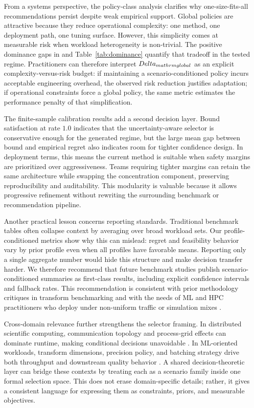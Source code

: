 \documentclass{article} %
\begin{document}
From a systems perspective, the policy-class analysis clarifies why one-size-fits-all recommendations persist despite weak empirical support. Global policies are attractive because they reduce operational complexity: one method, one deployment path, one tuning surface. However, this simplicity comes at measurable risk when workload heterogeneity is non-trivial. The positive dominance gaps in  and Table~\ref{tab:dominance} quantify that tradeoff in the tested regime. Practitioners can therefore interpret $\\Delta_{\\mathrm{global}}$ as an explicit complexity-versus-risk budget: if maintaining a scenario-conditioned policy incurs acceptable engineering overhead, the observed risk reduction justifies adaptation; if operational constraints force a global policy, the same metric estimates the performance penalty of that simplification.

The finite-sample calibration results add a second decision layer. Bound satisfaction at rate $1.0$ indicates that the uncertainty-aware selector is conservative enough for the generated regime, but the large mean gap between bound and empirical regret also indicates room for tighter confidence design. In deployment terms, this means the current method is suitable when safety margins are prioritized over aggressiveness. Teams requiring tighter margins can retain the same architecture while swapping the concentration component, preserving reproducibility and auditability. This modularity is valuable because it allows progressive refinement without rewriting the surrounding benchmark or recommendation pipeline.

Another practical lesson concerns reporting standards. Traditional benchmark tables often collapse context by averaging over broad workload sets. Our profile-conditioned metrics show why this can mislead: regret and feasibility behavior vary by prior profile even when all profiles have favorable means. Reporting only a single aggregate number would hide this structure and make decision transfer harder. We therefore recommend that future benchmark studies publish scenario-conditioned summaries as first-class results, including explicit confidence intervals and fallback rates. This recommendation is consistent with prior methodology critiques in transform benchmarking and with the needs of ML and HPC practitioners who deploy under non-uniform traffic or simulation mixes \citep{S03,S21,S42}.

Cross-domain relevance further strengthens the selector framing. In distributed scientific computing, communication topology and process-grid effects can dominate runtime, making conditional decisions unavoidable \citep{S06,S07,S09,S36,S42}. In ML-oriented workloads, transform dimensions, precision policy, and batching strategy drive both throughput and downstream quality behavior \citep{S15,S16,S18,S20}. A shared decision-theoretic layer can bridge these contexts by treating each as a scenario family inside one formal selection space. This does not erase domain-specific details; rather, it gives a consistent language for expressing them as constraints, priors, and measurable objectives.
\end{document}
